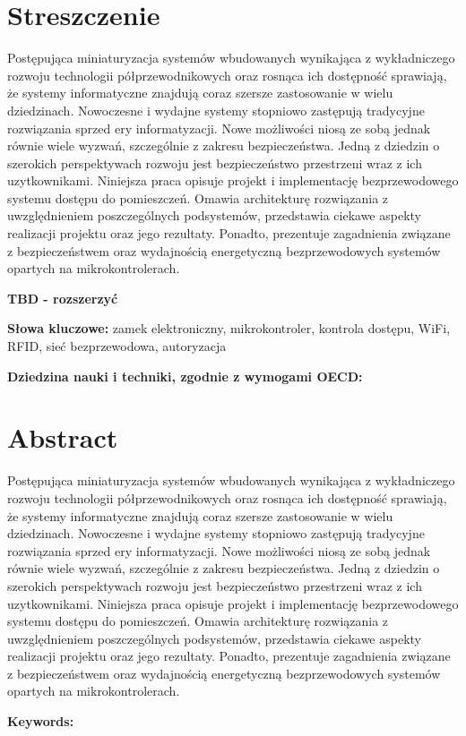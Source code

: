 \section*{Streszczenie}
	Postępująca miniaturyzacja systemów wbudowanych wynikająca z wykładniczego rozwoju technologii półprzewodnikowych oraz rosnąca ich dostępność sprawiają, że systemy informatyczne znajdują coraz szersze zastosowanie w wielu dziedzinach. Nowoczesne i wydajne systemy stopniowo zastępują tradycyjne rozwiązania sprzed ery informatyzacji. Nowe możliwości niosą ze sobą jednak równie wiele wyzwań, szczególnie z zakresu bezpieczeństwa. Jedną z dziedzin o szerokich perspektywach rozwoju jest bezpieczeństwo przestrzeni wraz z ich uzytkownikami. Niniejsza praca opisuje projekt i implementację bezprzewodowego systemu dostępu do pomieszczeń. Omawia architekturę rozwiązania z uwzględnieniem poszczególnych podsystemów, przedstawia ciekawe aspekty realizacji projektu oraz jego rezultaty. Ponadto, prezentuje zagadnienia związane z bezpieczeństwem oraz wydajnością energetyczną bezprzewodowych systemów opartych na mikrokontrolerach.

	\textbf{TBD - rozszerzyć}

	\textbf{Słowa kluczowe:} zamek elektroniczny, mikrokontroler, kontrola dostępu, WiFi, RFID, sieć bezprzewodowa, autoryzacja

	\textbf{Dziedzina nauki i techniki, zgodnie z wymogami OECD:}

\section*{Abstract}
	Postępująca miniaturyzacja systemów wbudowanych wynikająca z wykładniczego rozwoju technologii półprzewodnikowych oraz rosnąca ich dostępność sprawiają, że systemy informatyczne znajdują coraz szersze zastosowanie w wielu dziedzinach. Nowoczesne i wydajne systemy stopniowo zastępują tradycyjne rozwiązania sprzed ery informatyzacji. Nowe możliwości niosą ze sobą jednak równie wiele wyzwań, szczególnie z zakresu bezpieczeństwa. Jedną z dziedzin o szerokich perspektywach rozwoju jest bezpieczeństwo przestrzeni wraz z ich uzytkownikami. Niniejsza praca opisuje projekt i implementację bezprzewodowego systemu dostępu do pomieszczeń. Omawia architekturę rozwiązania z uwzględnieniem poszczególnych podsystemów, przedstawia ciekawe aspekty realizacji projektu oraz jego rezultaty. Ponadto, prezentuje zagadnienia związane z bezpieczeństwem oraz wydajnością energetyczną bezprzewodowych systemów opartych na mikrokontrolerach.

	\textbf{Keywords:}